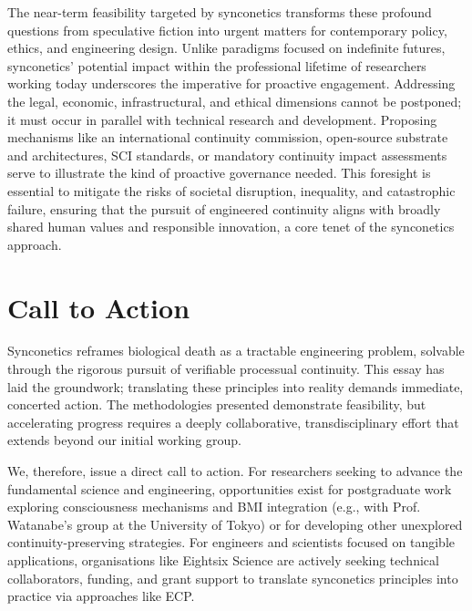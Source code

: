 \documentclass[10pt]{article}
\begin{document}
\begin{sloppypar}

  The near-term feasibility targeted by synconetics transforms these profound questions from speculative fiction into urgent matters for contemporary policy, ethics, and engineering design. Unlike paradigms focused on indefinite futures, synconetics’ potential impact within the professional lifetime of researchers working today underscores the imperative for proactive engagement. Addressing the legal, economic, infrastructural, and ethical dimensions cannot be postponed; it must occur in parallel with technical research and development. Proposing mechanisms like an international continuity commission, open-source substrate and architectures, SCI standards, or mandatory continuity impact assessments serve to illustrate the kind of proactive governance needed. This foresight is essential to mitigate the risks of societal disruption, inequality, and catastrophic failure, ensuring that the pursuit of engineered continuity aligns with broadly shared human values and responsible innovation, a core tenet of the synconetics approach.


  \section{Call to Action}
  \label{sec:call-to-action}

  Synconetics reframes biological death as a tractable engineering problem, solvable through the rigorous pursuit of verifiable processual continuity. This essay has laid the groundwork; translating these principles into reality demands immediate, concerted action. The methodologies presented demonstrate feasibility, but accelerating progress requires a deeply collaborative, transdisciplinary effort that extends beyond our initial working group.

  We, therefore, issue a direct call to action. For researchers seeking to advance the fundamental science and engineering, opportunities exist for postgraduate work exploring consciousness mechanisms and BMI integration (e.g., with Prof. Watanabe’s group at the University of Tokyo) or for developing other unexplored continuity-preserving strategies. For engineers and scientists focused on tangible applications, organisations like Eightsix Science are actively seeking technical collaborators, funding, and grant support to translate synconetics principles into practice via approaches like ECP.


\end{sloppypar}
\end{document}
